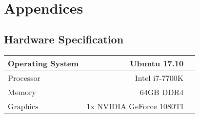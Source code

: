 \documentclass{uia}
\begin{document}
\appendix
\chapter*{Appendices}
\renewcommand{\thesection}{\Alph{section}}

\section{Hardware Specification}
\label{appendix:hwspec}
	\begin{table}[H]
	\begin{tabular}{|l*{1}{r}|r}
		\hline
		Operating System & Ubuntu 17.10  \\
		\hline
		Processor            & Intel i7-7700K \\
		\hline
		Memory           & 64GB DDR4  \\
		\hline
		Graphics     & 1x NVIDIA GeForce 1080TI   \\
		\hline
	\end{tabular}
\end{table}

\makebackcover
\end{document}
